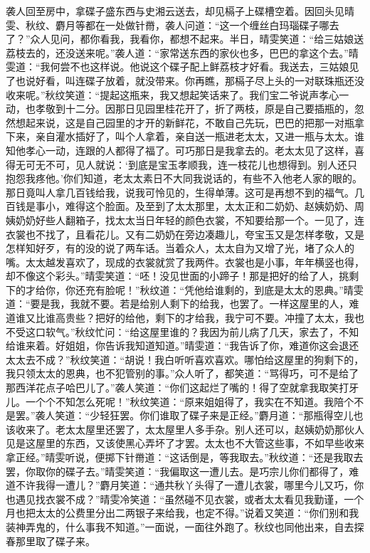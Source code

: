 \documentclass[12pt,oneside]{book}
\begin{document}
袭人回至房中，拿碟子盛东西与史湘云送去，却见槅子上碟槽空着。因回头见晴雯、秋纹、麝月等都在一处做针黹，袭人问道：“这一个缠丝白玛瑙碟子哪去了？”众人见问，都你看我，我看你，都想不起来。半日，晴雯笑道：“给三姑娘送荔枝去的，还没送来呢。”袭人道：“家常送东西的家伙也多，巴巴的拿这个去。”晴雯道：“我何尝不也这样说。他说这个碟子配上鲜荔枝才好看。我送去，三姑娘见了也说好看，叫连碟子放着，就没带来。你再瞧，那槅子尽上头的一对联珠瓶还没收来呢。”秋纹笑道：“提起这瓶来，我又想起笑话来了。我们宝二爷说声孝心一动，也孝敬到十二分。因那日见园里桂花开了，折了两枝，原是自己要插瓶的，忽然想起来说，这是自己园里的才开的新鲜花，不敢自己先玩，巴巴的把那一对瓶拿下来，亲自灌水插好了，叫个人拿着，亲自送一瓶进老太太，又进一瓶与太太。谁知他孝心一动，连跟的人都得了福了。可巧那日是我拿去的。老太太见了这样，喜得无可无不可，见人就说：‘到底是宝玉孝顺我，连一枝花儿也想得到。别人还只抱怨我疼他。’你们知道，老太太素日不大同我说话的，有些不入他老人家的眼的。那日竟叫人拿几百钱给我，说我可怜见的，生得单薄。这可是再想不到的福气。几百钱是事小，难得这个脸面。及至到了太太那里，太太正和二奶奶、赵姨奶奶、周姨奶奶好些人翻箱子，找太太当日年轻的颜色衣裳，不知要给那一个。一见了，连衣裳也不找了，且看花儿。又有二奶奶在旁边凑趣儿，夸宝玉又是怎样孝敬，又是怎样知好歹，有的没的说了两车话。当着众人，太太自为又增了光，堵了众人的嘴。太太越发喜欢了，现成的衣裳就赏了我两件。衣裳也是小事，年年横竖也得，却不像这个彩头。”晴雯笑道：“呸！没见世面的小蹄子！那是把好的给了人，挑剩下的才给你，你还充有脸呢！”秋纹道：“凭他给谁剩的，到底是太太的恩典。”晴雯道：“要是我，我就不要。若是给别人剩下的给我，也罢了。一样这屋里的人，难道谁又比谁高贵些？把好的给他，剩下的才给我，我宁可不要。冲撞了太太，我也不受这口软气。”秋纹忙问：“给这屋里谁的？我因为前儿病了几天，家去了，不知给谁来着。好姐姐，你告诉我知道知道。”晴雯道：“我告诉了你，难道你这会退还太太去不成？”秋纹笑道：“胡说！我白听听喜欢喜欢。哪怕给这屋里的狗剩下的，我只领太太的恩典，也不犯管别的事。”众人听了，都笑道：“骂得巧，可不是给了那西洋花点子哈巴儿了。”袭人笑道：“你们这起烂了嘴的！得了空就拿我取笑打牙儿。一个个不知怎么死呢！”秋纹笑道：“原来姐姐得了，我实在不知道。我陪个不是罢。”袭人笑道：“少轻狂罢。你们谁取了碟子来是正经。”麝月道：“那瓶得空儿也该收来了。老太太屋里还罢了，太太屋里人多手杂。别人还可以，赵姨奶奶那伙人见是这屋里的东西，又该使黑心弄坏了才罢。太太也不大管这些事，不如早些收来拿正经。”晴雯听说，便掷下针黹道：“这话倒是，等我取去。”秋纹道：“还是我取去罢，你取你的碟子去。”晴雯笑道：“我偏取这一遭儿去。是巧宗儿你们都得了，难道不许我得一遭儿？”麝月笑道：“通共秋丫头得了一遭儿衣裳，哪里今儿又巧，你也遇见找衣裳不成？”晴雯冷笑道：“虽然碰不见衣裳，或者太太看见我勤谨，一个月也把太太的公费里分出二两银子来给我，也定不得。”说着又笑道：“你们别和我装神弄鬼的，什么事我不知道。”一面说，一面往外跑了。秋纹也同他出来，自去探春那里取了碟子来。
\end{document}
